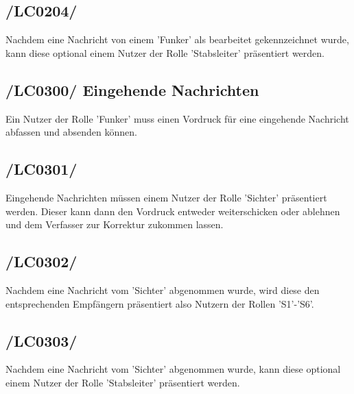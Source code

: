 \subsection{/LC0204/}
Nachdem eine Nachricht von einem 'Funker' als bearbeitet gekennzeichnet wurde, kann diese optional einem Nutzer der Rolle 'Stabsleiter' präsentiert werden.

\subsection{/LC0300/ Eingehende Nachrichten} 
Ein Nutzer der Rolle 'Funker' muss einen Vordruck für eine eingehende Nachricht abfassen und absenden können.

\subsection{/LC0301/}
Eingehende Nachrichten müssen einem Nutzer der Rolle 'Sichter' präsentiert werden. Dieser kann dann den Vordruck entweder weiterschicken oder ablehnen und dem Verfasser zur Korrektur zukommen lassen.

\subsection{/LC0302/}
Nachdem eine Nachricht vom 'Sichter' abgenommen wurde, wird diese den entsprechenden Empfängern präsentiert also Nutzern der Rollen 'S1'-'S6'.

\subsection{/LC0303/}
Nachdem eine Nachricht vom 'Sichter' abgenommen wurde, kann diese optional einem Nutzer der Rolle 'Stabsleiter' präsentiert werden.